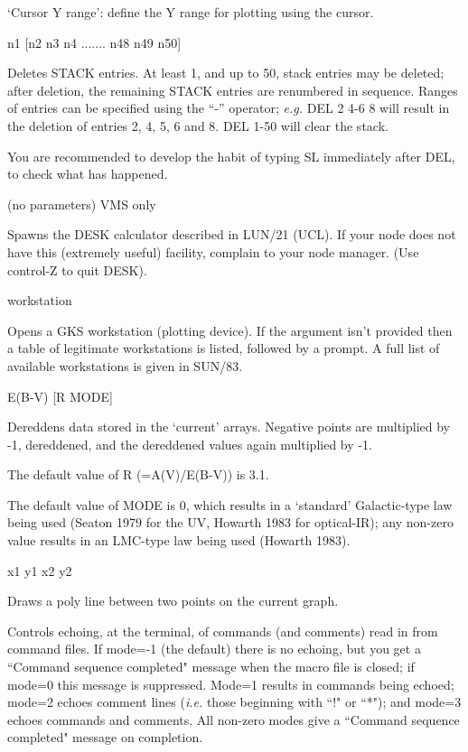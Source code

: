 \begin {description}
`Cursor Y range': define the Y range for plotting using the cursor.

\item [DEL] n1 [n2 n3 n4 ....... n48 n49 n50]

Deletes STACK entries. At least 1, and up to 50, stack entries may be
deleted; after deletion, the remaining STACK entries are renumbered in
sequence. Ranges of entries can be specified using the ``-'' operator;
{\em e.g.} DEL 2 4-6 8 will result in the deletion of entries 2, 4, 5,
6 and 8. DEL 1-50 will clear the stack.

You are recommended to develop the habit of typing SL immediately after
DEL, to check what has happened.

\item [DESK] (no parameters) VMS only

Spawns the DESK calculator described in LUN/21 (UCL). If your node
does not have this (extremely useful) facility, complain to your node
manager. (Use control-Z to quit DESK).

\item [DEV] workstation

Opens a GKS workstation (plotting device). If the argument isn't
provided then a table of legitimate workstations is listed, followed
by a prompt. A full list of available workstations is given in SUN/83.

\item [DRED] E(B-V) [R MODE]

Dereddens data stored in the `current' arrays. Negative points are
multiplied by -1, dereddened, and the dereddened values again
multiplied by -1.

The default value of R (=A(V)/E(B-V)) is 3.1.

The default value of MODE is 0, which results in a `standard'
Galactic-type law being used (Seaton 1979 for the UV, Howarth 1983 for
optical-IR); any non-zero value results in an LMC-type law being used
(Howarth 1983).

\item [DRLINE] x1 y1 x2 y2

Draws a poly line between two points on the current graph.

\item [ECHO] [mode]

Controls echoing, at the terminal, of commands (and comments) read in
from command files. If mode=-1 (the default) there is no echoing, but
you get a ``Command sequence completed" message when the macro file is
closed;  if mode=0 this message is suppressed. Mode=1 results in
commands being echoed;  mode=2 echoes comment lines ({\em i.e.} those
beginning with ``!" or ``*");  and mode=3 echoes commands and
comments. All non-zero modes give a ``Command sequence completed"
message on completion.


\end{description}
